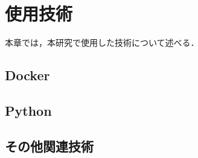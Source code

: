 \section{使用技術}\label{sec2}

本章では，本研究で使用した技術について述べる．

\subsection{Docker}


\subsection{Python}


\subsection{その他関連技術}
